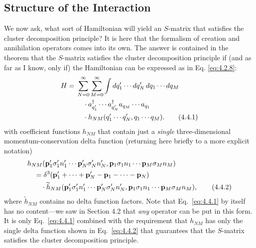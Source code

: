 
\subsection{Structure of the Interaction}

We now ask, what sort of Hamiltonian will yield an $S$-matrix that satisfies the
cluster decomposition principle? It is here that the formalism of creation and
annihilation operators comes into its own. The answer is contained in the
theorem that the $S$-matrix satisfies the cluster decomposition principle if
(and as far as I know, only if) the Hamiltonian can be expressed as in Eq.
\eqref{eq:4.2.8}:
\begin{align}
H={}&\sum_{N=0}^{\infty}\sum_{M=0}^{\infty}
 \int dq'_1\cdots dq'_N\,dq_1\cdots dq_M \notag\\
&\quad\cdot a^\dagger_{q'_1}\cdots a^\dagger_{q'_N}
 a_{q_M}\cdots a_{q_1} \notag\\
&\quad\cdot h_{NM}(q'_1\cdots q'_N,q_1\cdots q_M).
\tag{4.4.1}
\label{eq:4.4.1}
\end{align}
with coefficient functions $h_{NM}$ that contain just a \emph{single}
three-dimensional momentum-conservation delta function (returning here briefly
to a more explicit notation)
\begin{align}
&h_{NM}(\mathbf{p}'_1\sigma'_1 n'_1\cdots
 \mathbf{p}'_N\sigma'_N n'_N,
 \mathbf{p}_1\sigma_1 n_1\cdots \mathbf{p}_M\sigma_M n_M)
 \notag\\
&\quad={}
 \delta^3(\mathbf{p}'_1+\cdots+\mathbf{p}'_N
 -\mathbf{p}_1-\cdots-\mathbf{p}_N) \notag\\
&\qquad\cdot
 \widetilde h_{NM}(\mathbf{p}'_1\sigma'_1 n'_1\cdots
 \mathbf{p}'_N\sigma'_N n'_N,
 \mathbf{p}_1\sigma_1 n_1\cdots \mathbf{p}_M\sigma_M n_M),
\tag{4.4.2}
\label{eq:4.4.2}
\end{align}
where $\widetilde h_{NM}$ contains no delta function factors. Note that
Eq.~\eqref{eq:4.4.1} by itself has no content---we saw in Section 4.2 that \emph{any}
operator can be put in this form. It is only Eq.~\eqref{eq:4.4.1} combined with the
requirement that $h_{NM}$ has only the single delta function shown in
Eq.~\eqref{eq:4.4.2} that guarantees that the $S$-matrix satisfies the cluster decomposition
principle.

